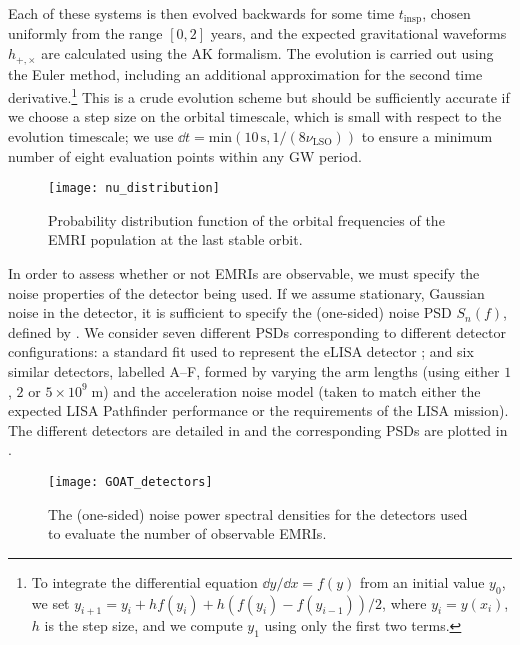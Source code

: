 Each of these systems is then evolved backwards for some time $t_\mathrm{insp}$, chosen uniformly from the range $[0,2]$ years, and the expected gravitational waveforms $h_{+,\times}$ are calculated using the AK formalism. The evolution is carried out using the Euler method, including an additional approximation for the second time derivative.\footnote{To integrate the differential equation $\dd y/\dd x = f(y)$ from an initial value $y_0$, we set $y_{i+1} = y_i + h f(y_i) + h(f(y_i) - f(y_{i-1}))/2$, where $y_i = y(x_i)$, $h$ is the step size, and we compute $y_1$ using only the first two terms.} This is a crude evolution scheme but should be sufficiently accurate if we choose a step size on the orbital timescale, which is small with respect to the evolution timescale; we use $\dd t = \mathrm{min}(10\,\mathrm{s}, 1/(8\nu_\mathrm{LSO}))$ to ensure a minimum number of eight evaluation points within any GW period.

\begin{figure}[htbp]
\centering
\texttt{[image: nu\_distribution]}
\caption{\label{fig:EMRI-nu-distribution}Probability distribution function of the orbital frequencies of the EMRI population at the last stable orbit.}
\end{figure}

In order to assess whether or not EMRIs are observable, we must specify the noise properties of the detector being used. If we assume stationary, Gaussian noise in the detector, it is sufficient to specify the (one-sided) noise PSD $S_n(f)$, defined by . We consider seven different PSDs corresponding to different detector configurations: a standard fit used to represent the eLISA detector \citep{amaro-seoane_elisa:_2013}; and six similar detectors, labelled A--F, formed by varying the arm lengths (using either $1$, $2$ or $5\times 10^9\;\mathrm{m}$) and the acceleration noise model (taken to match either the expected LISA Pathfinder performance or the requirements of the LISA mission). The different detectors are detailed in  and the corresponding PSDs are plotted in .

\begin{figure}[htbp]
\centering
\texttt{[image: GOAT\_detectors]}
\caption{\label{fig:EMRI-detector-PSDs}The (one-sided) noise power spectral densities for the detectors used to evaluate the number of observable EMRIs.}
\end{figure}

